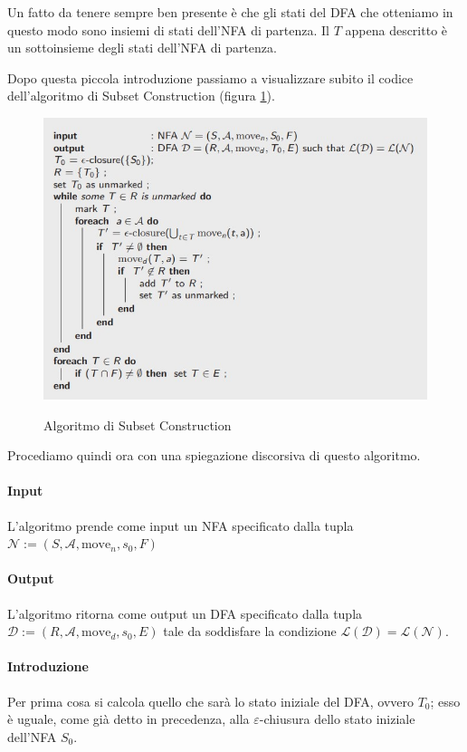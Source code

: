 \documentclass[class=book, crop=false, oneside, 12pt]{standalone}
\begin{document}
Un fatto da tenere sempre ben presente è che gli stati del DFA che otteniamo in questo modo sono insiemi di stati dell'NFA di partenza. Il \(T\) appena descritto è un sottoinsieme degli stati dell'NFA di partenza.

Dopo questa piccola introduzione passiamo a visualizzare subito il codice dell'algoritmo di Subset Construction (figura \ref{algoritmo_subset_construction}).
\begin{figure}
    \centering
    \includegraphics[width=.8\textwidth,keepaspectratio]{subset_construction_algorithm.jpg}
    \label{algoritmo_subset_construction}
    \caption{Algoritmo di Subset Construction}
\end{figure}
Procediamo quindi ora con una spiegazione discorsiva di questo algoritmo.
\paragraph*{Input}
L'algoritmo prende come input un NFA specificato dalla tupla \(\mathcal{N} := (S, \mathcal{A}, \textrm{move}_n, s_0, F)\)

\paragraph*{Output}
L'algoritmo ritorna come output un DFA specificato dalla tupla \(\mathcal{D} := (R, \mathcal{A}, \textrm{move}_d, s_0, E)\) tale da soddisfare la condizione \(\mathcal{L}(\mathcal{D}) = \mathcal{L}(\mathcal{N})\).

\paragraph*{Introduzione}
Per prima cosa si calcola quello che sarà lo stato iniziale del DFA, ovvero \(T_0\); esso è uguale, come già detto in precedenza, alla \(\varepsilon\)-chiusura dello stato iniziale dell'NFA \(S_0\).
\end{document}

